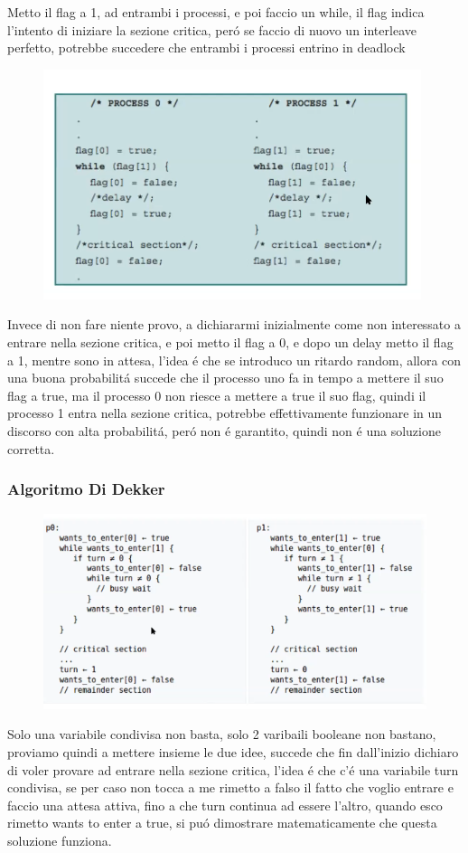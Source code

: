 Metto il flag a 1, ad entrambi i processi, e poi faccio un while, il flag indica l'intento di iniziare
la sezione critica, peró se faccio di nuovo un interleave perfetto, potrebbe succedere che entrambi i processi
entrino in deadlock

\begin{figure}[H]
    \centering
    \includegraphics[width=0.7\linewidth]{immagini/MutuaEsclusioneQuartoTentativo}
\end{figure}

Invece di non fare niente provo, a dichiararmi inizialmente come non interessato a entrare nella sezione critica, e poi
metto il flag a 0, e dopo un delay metto il flag a 1, mentre sono in attesa, l'idea é che se introduco un ritardo
random, allora con una buona probabilitá succede che il processo uno fa in tempo a mettere il suo flag a true, ma
il processo 0 non riesce a mettere a true il suo flag, quindi il processo 1 entra nella sezione critica, potrebbe effettivamente
funzionare in un discorso con alta probabilitá, peró non é garantito, quindi non é una soluzione corretta.
\subsubsection*{Algoritmo Di Dekker}
\begin{figure}[H]
    \centering
    \includegraphics[width=0.7\linewidth]{immagini/Dekker}
\end{figure}
Solo una variabile condivisa non basta, solo 2 varibaili booleane non bastano, proviamo quindi a mettere insieme
le due idee, succede che fin dall'inizio dichiaro di voler provare ad entrare nella sezione critica, l'idea é che c'é
una variabile turn condivisa, se per caso non tocca a me rimetto a falso il fatto che voglio entrare e faccio una
attesa attiva, fino a che turn continua ad essere l'altro, quando esco rimetto wants to enter a true, si puó dimostrare
matematicamente che questa soluzione funziona.

